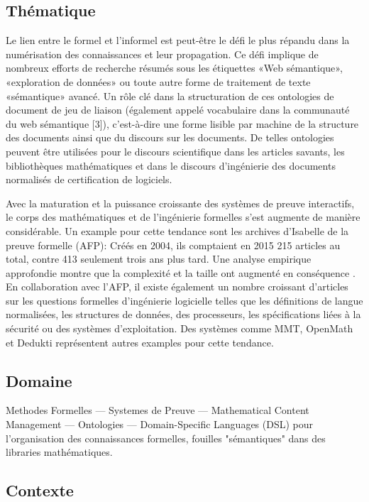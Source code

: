 \documentclass[a4paper,10pt]{article}
\begin{document}
\subsection*{Thématique}

Le lien entre le formel et l'informel est peut-être
le défi le plus répandu dans la numérisation des connaissances
et leur propagation.
Ce défi implique de nombreux efforts de recherche
résumés sous les étiquettes «Web sémantique», «exploration de données»
ou toute autre forme de traitement de texte «sémantique» avancé.
Un rôle clé dans la structuration
de ces ontologies de document de jeu de liaison
(également appelé vocabulaire dans la communauté du web sémantique [3]),
c'est-à-dire une forme lisible par machine
de la structure des documents ainsi que du discours sur les documents.
De telles ontologies peuvent être utilisées
pour le discours scientifique dans les articles savants,
les bibliothèques mathématiques
et dans le discours d'ingénierie des documents normalisés
de certification de logiciels.

Avec la maturation et la puissance croissante
des systèmes de preuve interactifs,
le corps des mathématiques et de l'ingénierie formelles s'est augmente
de manière considérable.
Un example pour cette tendance sont
les archives d'Isabelle \cite{afp} de la preuve formelle (AFP):
Créés en 2004, ils comptaient en 2015 215 articles au total,
contre 413 seulement trois ans plus tard.
Une analyse empirique approfondie montre que
la complexité et la taille ont augmenté en conséquence
\cite{DBLP:conf/mkm/BlanchetteHMN15}.
En collaboration avec l'AFP, il existe également un nombre croissant d'articles
sur les questions formelles d'ingénierie logicielle
telles que les définitions de langue normalisées,
les structures de données, des processeurs,
les spécifications liées à la sécurité  ou des systèmes d'exploitation.
Des systèmes comme MMT\cite{mmt}, OpenMath\cite{openmath}
et Dedukti \cite{dedukti} représentent
autres examples pour cette tendance.

\subsection*{Domaine}

Methodes Formelles --- Systemes de Preuve --- Mathematical Content Management
--- Ontologies
--- Domain-Specific Languages (DSL)
    pour l'organisation des connaissances formelles,
    fouilles "sémantiques" dans des libraries mathématiques.

\subsection*{Contexte}
\end{document}
